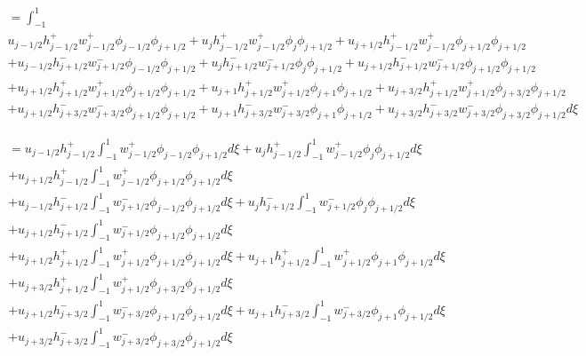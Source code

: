 \documentclass[12pt]{article}
\begin{document}
\begin{multline*}
= \int_{-1}^{1}   \\u_{j - 1/2}h^+_{j - 1/2}w^+_{j - 1/2}\phi_{j - 1/2}\phi_{j+1/2} + u_{j}h^+_{j - 1/2}w^+_{j - 1/2}\phi_{j }\phi_{j+1/2} + u_{j + 1/2}h^+_{j - 1/2}w^+_{j - 1/2}\phi_{j + 1/2} \phi_{j+1/2}
\\ +u_{j - 1/2}h^-_{j + 1/2}w^-_{j + 1/2} \phi_{j - 1/2}\phi_{j+1/2} + u_{j}h^-_{j + 1/2}w^-_{j + 1/2} \phi_{j }\phi_{j+1/2} + u_{j + 1/2}h^-_{j + 1/2}w^-_{j + 1/2} \phi_{j + 1/2}\phi_{j+1/2} 
\\ + u_{j + 1/2}h^+_{j + 1/2}w^+_{j + 1/2}\phi_{j + 1/2}\phi_{j+1/2} + u_{j + 1}h^+_{j + 1/2}w^+_{j + 1/2}\phi_{j + 1}\phi_{j+1/2} + u_{j + 3/2}h^+_{j + 1/2}w^+_{j + 1/2}\phi_{j + 3/2}\phi_{j+1/2} 
\\ +u_{j + 1/2}h^-_{j + 3/2}w^-_{j + 3/2}\phi_{j + 1/2}\phi_{j+1/2} + u_{j + 1}h^-_{j + 3/2}w^-_{j + 3/2}\phi_{j + 1}\phi_{j+1/2} + u_{j + 3/2}h^-_{j + 3/2}w^-_{j + 3/2}\phi_{j + 3/2}\phi_{j+1/2} d\xi
\end{multline*}

\begin{multline*}
= u_{j - 1/2}h^+_{j - 1/2} \int_{-1}^{1}w^+_{j - 1/2}\phi_{j - 1/2}\phi_{j+1/2}d\xi + u_{j}h^+_{j - 1/2}\int_{-1}^{1}w^+_{j - 1/2}\phi_{j }\phi_{j+1/2}d\xi \\+ u_{j + 1/2}h^+_{j - 1/2} \int_{-1}^{1}w^+_{j - 1/2}\phi_{j + 1/2} \phi_{j+1/2}d\xi
\\ +u_{j - 1/2}h^-_{j + 1/2}\int_{-1}^{1}w^-_{j + 1/2} \phi_{j - 1/2}\phi_{j+1/2}d\xi + u_{j}h^-_{j + 1/2} \int_{-1}^{1}w^-_{j + 1/2} \phi_{j }\phi_{j+1/2}d\xi \\+ u_{j + 1/2}h^-_{j + 1/2}\int_{-1}^{1}w^-_{j + 1/2} \phi_{j + 1/2}\phi_{j+1/2} d\xi
\\ + u_{j + 1/2}h^+_{j + 1/2}\int_{-1}^{1}w^+_{j + 1/2}\phi_{j + 1/2}\phi_{j+1/2}d\xi + u_{j + 1}h^+_{j + 1/2}\int_{-1}^{1}w^+_{j + 1/2}\phi_{j + 1}\phi_{j+1/2}d\xi \\+ u_{j + 3/2}h^+_{j + 1/2}\int_{-1}^{1}w^+_{j + 1/2}\phi_{j + 3/2}\phi_{j+1/2} d\xi
\\ +u_{j + 1/2}h^-_{j + 3/2}\int_{-1}^{1}w^-_{j + 3/2}\phi_{j + 1/2}\phi_{j+1/2}d\xi + u_{j + 1}h^-_{j + 3/2}\int_{-1}^{1}w^-_{j + 3/2}\phi_{j + 1}\phi_{j+1/2}d\xi \\+ u_{j + 3/2}h^-_{j + 3/2}\int_{-1}^{1}w^-_{j + 3/2}\phi_{j + 3/2}\phi_{j+1/2} d\xi
\end{multline*}
\end{document}
